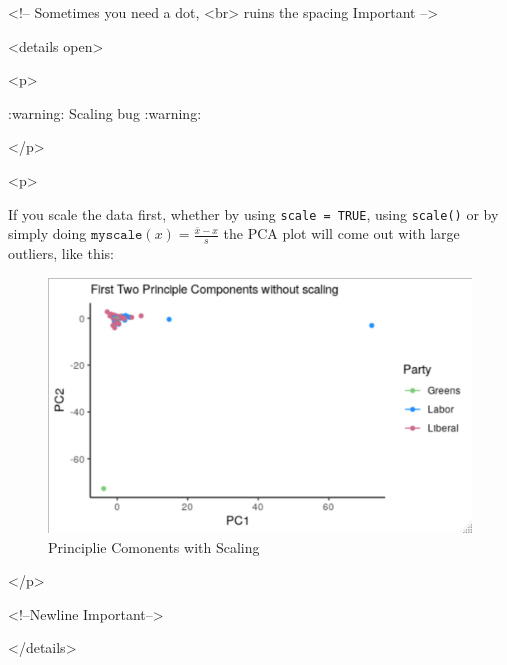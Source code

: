 \documentclass[11pt]{article}
\begin{document}
\begin{HTML}
<!-- Sometimes you need a dot, <br> ruins the spacing Important -->
\end{HTML}

\begin{HTML}
<details open>
\end{HTML}

\begin{HTML}
<p>
\end{HTML}

:warning: Scaling bug :warning:

\begin{HTML}
</p>
\end{HTML}

\begin{HTML}
<p>
\end{HTML}

If you scale the data first, whether by using \texttt{scale = TRUE}, using
\texttt{scale()} or by simply doing \(\mathtt{myscale}(x) = \frac{\bar{x}-x}{s}\)
the PCA plot will come out with large outliers, like this:

\begin{figure}[htbp]
\centering
\includegraphics[width=.9\linewidth]{media/20200423103234597_1312556818.png}
\caption{Principlie Comonents with Scaling}
\end{figure}

\begin{HTML}
</p>
\end{HTML}

\begin{HTML}
<!--Newline Important-->
\end{HTML}

\begin{HTML}
</details>
\end{HTML}
\end{document}
